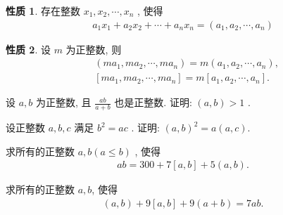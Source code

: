 \documentclass[aspectratio=169]{ctexbeamer}
\theoremstyle{definition}
\newtheorem{property}{性质}[section]
\begin{document}
\begin{frame}
	\begin{property}
		存在整数 $x_{1}, x_{2}, \cdots, x_{n}$ , 使得
		\begin{align*}
			a_{1} x_{1}+a_{2} x_{2}+\cdots+a_{n} x_{n}=\left(a_{1}, a_{2}, \cdots, a_{n}\right)
		\end{align*}
	\end{property}
	\begin{property}\label{prop:最大公因数与最小公倍数的可乘性}
		设 $m$ 为正整数, 则
		\begin{align}
			 & \left(m a_{1}, m a_{2}, \cdots, m a_{n}\right)=m\left(a_{1}, a_{2}, \cdots, a_{n}\right),   \\
			 & {\left[m a_{1}, m a_{2}, \cdots, m a_{n}\right]=m\left[a_{1}, a_{2}, \cdots, a_{n}\right]}.
		\end{align}
	\end{property}
\end{frame}

\begin{frame}[t]
	\begin{example}
		设 $a ,  b$ 为正整数, 且 $\frac{a b}{a+b}$ 也是正整数. 证明:  $(a, b)>1$ .
	\end{example}
\end{frame}

\begin{frame}[t]
	\begin{example}
		设正整数 $a ,  b ,  c$ 满足 $b^{2}=a c$ . 证明: $(a, b)^{2}=a(a, c)$.
	\end{example}
\end{frame}

\begin{frame}[t]
	\begin{example}
		求所有的正整数 $a ,  b(a \leqslant b)$ , 使得
		\begin{align}\label{最大公因数与最小公倍数-例3}
			a b=300+7[a, b]+5(a, b).
		\end{align}
	\end{example}
\end{frame}

\begin{frame}[t]
	\begin{example}
		求所有的正整数 $a ,  b$, 使得
		\begin{align}\label{eq:最大公因数与最小公倍数-例4-1}
			(a, b)+9[a, b]+9(a+b)=7 a b.
		\end{align}
	\end{example}
\end{frame}
\end{document}
